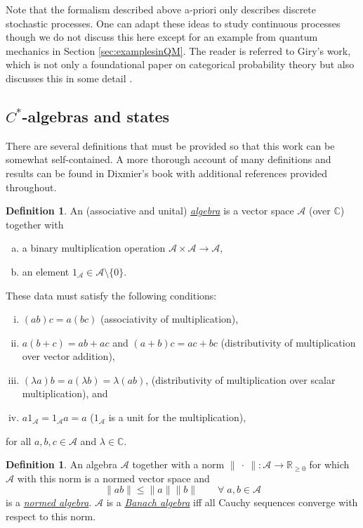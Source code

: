 \documentclass[12pt]{article}
\theoremstyle{theorem}
\theoremstyle{definition}
\newtheorem{definition}[equation]{Definition}
\numberwithin{equation}{section}
\let\l=\lambda \let\r=\rho
\let\C=\Chi \let\W=\Omega
\newcommand{\be}{\begin{equation}}
\newcommand{\ee}{\end{equation}}
\newcommand{\bd}{\begin{definition}}
\newcommand{\ed}{\end{definition}}
\newcommand{\<}{\langle}
\renewcommand{\>}{\rangle}
\def\R{{{\mathbb R}}}
\def\C{{{\mathbb C}}}
\def\mA{{{\mathcal{A}}}}
\begin{document}
Note that the formalism described above a-priori only describes discrete stochastic 
processes. One can adapt these ideas to study continuous processes
though we do not discuss this here except for an example from quantum
mechanics in Section \ref{sec:examplesinQM}. The reader is referred to
Giry's work, which is not only a foundational paper on categorical 
probability theory but also discusses this in some detail \cite{Gi82}. 

\subsection{$C^*$-algebras and states}

There are several definitions that must be provided
so that this work can be somewhat self-contained. 
A more thorough account of many definitions and results can be found in
Dixmier's book \cite{Di77} with additional references provided throughout.

\bd
\label{defn:algebra}
An (associative and unital) \emph{\uline{algebra}} 
is a vector space $\mA$ (over $\C$) together with 
\begin{enumerate}[(a)]
\setlength{\itemsep}{0pt}
\item
a binary multiplication operation
$\mA\times\mA\to\mA,$
\item
an element $1_{\mA}\in\mA\setminus\{0\}.$ 
\end{enumerate}
These data must satisfy the following conditions:
\begin{enumerate}[i.]
\setlength{\itemsep}{0pt}
\item
$(ab)c=a(bc)$ (associativity of multiplication),
\item
$a(b+c)=ab+ac$ and $(a+b)c=ac+bc$
(distributivity of multiplication over vector addition),
\item
$(\l a)b=a(\l b)=\l(ab)$, 
(distributivity of multiplication over scalar multiplication),
and 
\item
$a1_{\mA}=1_{\mA}a=a$
($1_{\mA}$ is a unit for the multiplication), 
\end{enumerate}
for all $a,b,c\in\mA$ and $\l\in\C.$ 
\ed

\bd
\label{defn:normedalgebra}
An algebra $\mA$ together with a norm
$\lVert \ \cdot \ \rVert:\mA\to\R_{\ge0}$ for which
$\mA$ with this norm is a normed vector space and
\be
\lVert ab\rVert\le\lVert a\rVert\lVert b\rVert\qquad\forall\;a,b\in\mA
\ee
is a \emph{\uline{normed algebra}}. 
$\mA$ is a \emph{\uline{Banach algebra}} iff 
all Cauchy sequences converge with respect to this norm.
\ed
\end{document}
